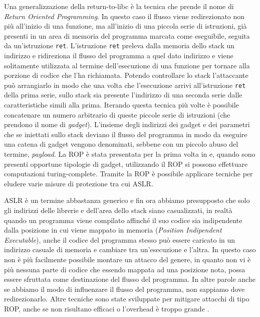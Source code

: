 Una generalizzazione della return-to-libc \`{e} la tecnica che prende
il nome di \emph{Return Oriented
  Programming}\cite{Shacham-2007,Roemer-2012}. In questo caso il
flusso viene redirezionato non pi\`{u} all'inizio di una funzione, ma
all'inizio di una piccola serie di istruzioni, gi\`{a} presenti in un
area di memoria del programma marcata come eseguibile, seguita da
un'istruzione \lstinline{ret}. L'istruzione \lstinline{ret} preleva dalla
memoria dello stack un indirizzo e ridireziona il flusso del programma
a quel dato indirizzo e viene solitamente utilizzata al termine
dell'esecuzione di una funzione per tornare alla porzione di codice
che l'ha richiamata. Potendo controllare lo stack l'attaccante pu\`{o}
arrangiarlo in modo che una volta che l'esecuzione arrivi
all'istruzione \lstinline{ret} della prima serie, sullo stack sia
presente l'indirizzo di una seconda serie dalle caratteristiche simili
alla prima. Iterando questa tecnica pi\`{u} volte \`{e} possibile
concatenare un numero arbitrario di queste piccole serie di istruzioni
(che prendono il nome di \emph{gadget}). L'insieme degli indirizzi dei
gadget e dei parametri che se iniettati sullo stack deviano il flusso
del programma in modo da eseguire una catena di gadget vengono
denominati, sebbene con un piccolo abuso del termine,
\emph{payload}. La ROP \`{e} stata presentata per la prima volta in
\cite{Shacham-2007} e, quando sono presenti opportune tipologie di
gadget, utilizzando il ROP si possono effettuare computazioni
turing-complete. Tramite la ROP \`{e} possibile applicare tecniche per
eludere varie misure di protezione \cite{roglia:2009} tra cui ASLR.

ASLR \`{e} un termine abbastanza generico e fin ora abbiamo presupposto
che solo gli indirizzi delle librerie e dell'area dello stack siano
casualizzati, in realt\`{a} quando un programma viene compilato affinch\'{e}
il suo codice sia indipendente dalla posizione in cui viene mappato in
memoria (\emph{Position Indipendent Executable}), anche il codice del
programma stesso pu\`{o} essere caricato in un indirizzo casuale di
memoria e cambiare tra un'esecuzione e l'altra. In questo caso non \`{e}
pi\`{u} facilmente possibile montare un attacco del genere, in quanto non
vi \`{e} pi\`{u} nessuna parte di codice che essendo mappata ad una posizione
nota, possa essere sfruttata come destinazione del flusso del
programma. In altre parole anche se abbiamo il modo di influenzare il
flusso del programma, non sappiamo dove redirezionarlo. Altre tecniche
sono state sviluppate per mitigare attacchi di tipo ROP, anche se non
risultano efficaci o l'overhead \`{e} troppo grande \cite{Davi-2014}.

